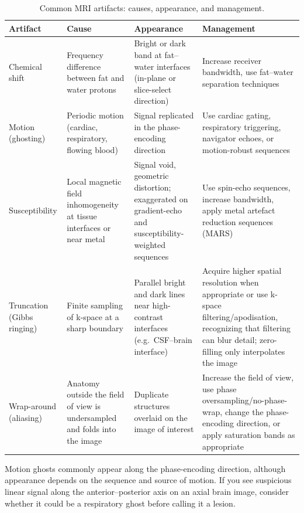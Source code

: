 \begin{table}[h]
\centering
\caption{Common MRI artifacts: causes, appearance, and management.}
\label{tab:mri_artifacts}
\begin{tabular}{p{3cm} p{3.5cm} p{3.5cm} p{4cm}}
\toprule
\textbf{Artifact} & \textbf{Cause} & \textbf{Appearance} & \textbf{Management} \\
\midrule
Chemical shift & Frequency difference between fat and water protons & Bright or dark band at fat--water interfaces (in-plane or slice-select direction) & Increase receiver bandwidth, use fat--water separation techniques \\
Motion (ghosting) & Periodic motion (cardiac, respiratory, flowing blood) & Signal replicated in the phase-encoding direction & Use cardiac gating, respiratory triggering, navigator echoes, or motion-robust sequences \\
Susceptibility & Local magnetic field inhomogeneity at tissue interfaces or near metal & Signal void, geometric distortion; exaggerated on gradient-echo and susceptibility-weighted sequences & Use spin-echo sequences, increase bandwidth, apply metal artefact reduction sequences (MARS) \\
Truncation (Gibbs ringing) & Finite sampling of k-space at a sharp boundary & Parallel bright and dark lines near high-contrast interfaces (e.g.\ CSF--brain interface) & Acquire higher spatial resolution when appropriate or use k-space filtering/apodisation, recognizing that filtering can blur detail; zero-filling only interpolates the image \\
Wrap-around (aliasing) & Anatomy outside the field of view is undersampled and folds into the image & Duplicate structures overlaid on the image of interest & Increase the field of view, use phase oversampling/no-phase-wrap, change the phase-encoding direction, or apply saturation bands as appropriate \\
\bottomrule
\end{tabular}
\end{table}

\begin{pearlbox}
Motion ghosts commonly appear along the phase-encoding direction, although appearance depends on the sequence and source of motion. If you see suspicious linear signal along the anterior--posterior axis on an axial brain image, consider whether it could be a respiratory ghost before calling it a lesion.
\end{pearlbox}

